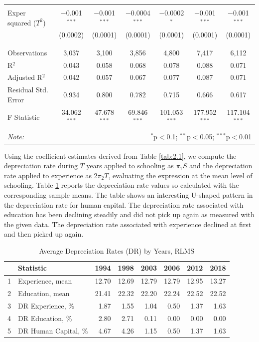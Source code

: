 \documentclass[12pt,a4paper]{article}
\numberwithin{equation}{section}
\begin{document}
\begin{table}[h!]
\begin{tabular}{@{\extracolsep{3pt}}lcccccc}
		& & & & & & \\ 
		Exper squared ($T^2$) & $-$0.001$^{***}$ & $-$0.001$^{***}$ & $-$0.0004$^{***}$ & $-$0.0002$^{*}$ & $-$0.001$^{***}$ & $-$0.001$^{***}$ \\ 
		& (0.0002) & (0.0001) & (0.0001) & (0.0001) & (0.0001) & (0.0001) \\ 
		& & & & & & \\ 
		\hline \\[-1.8ex] 
		Observations & 3,037 & 3,100 & 3,856 & 4,800 & 7,417 & 6,112 \\ 
		R$^{2}$ & 0.043 & 0.058 & 0.068 & 0.078 & 0.088 & 0.071 \\ 
		Adjusted R$^{2}$ & 0.042 & 0.057 & 0.067 & 0.077 & 0.087 & 0.071 \\ 
		Residual Std. Error & 0.934 & 0.800 & 0.782 & 0.715 & 0.666 & 0.617 \\ 
		F Statistic & 34.062$^{***}$ & 47.678$^{***}$ & 69.846$^{***}$ & 101.053$^{***}$ & 177.952$^{***}$ & 117.104$^{***}$ \\ 
		\hline 
		\hline \\[-1.8ex] 
		\textit{Note:}  & \multicolumn{6}{r}{$^{*}$p$<$0.1; $^{**}$p$<$0.05; $^{***}$p$<$0.01} \\ 
	\end{tabular} 
\end{table}


Using the coefficient estimates derived from Table \ref{tab:2.1}, we compute the depreciation rate during $T$ years applied to schooling as $\pi_{1}S $ and the depreciation rate applied to experience as $ 2\pi_{2}T$, evaluating the expression at the mean level of schooling. Table \ref{tab:2.2} reports the depreciation rate values so calculated with the corresponding sample means. The table shows an interesting U-shaped pattern in the depreciation rate for human capital. The depreciation rate associated with education has been declining steadily and did not pick up again as measured with the given data. The depreciation rate associated with experience declined at first and then picked up again. 

\begin{table}[h!]
	\centering
	\caption{Average Depreciation Rates (DR) by Years, RLMS}
	\label{tab:2.2}
	\begin{tabular}{@{\extracolsep{20pt}}rlrrrrrr}
		\hline
		& \textbf{Statistic} & \textbf{1994} & \textbf{1998} & \textbf{2003} & \textbf{2006} & \textbf{2012} & \textbf{2018} \\ 
		\hline
		1 & Experience, mean & 12.70 & 12.69 & 12.79 & 12.79 & 12.95 & 13.27 \\ 
		2 & Education, mean & 21.41 & 22.32 & 22.20 & 22.24 & 22.52 & 22.52 \\ 
		\midrule
		3 & DR Experience, \% & 1.87 & 1.55 & 1.04 & 0.50 & 1.37 & 1.63 \\ 
		4 & DR Education, \% & 2.80 & 2.71 & 0.11 & 0.00 & 0.00 & 0.00 \\ 
		5 & DR Human Capital, \% & 4.67 & 4.26 & 1.15 & 0.50 & 1.37 & 1.63 \\ 
		\hline
	\end{tabular}
\end{table}
	
\end{document}
